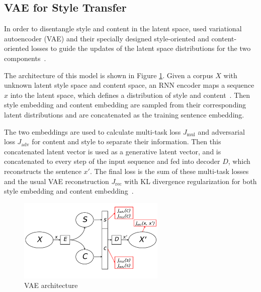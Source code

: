 \documentclass[11pt,a4paper]{article}
\newcommand{\figref}[1]{Figure \ref{#1}}
\begin{document}
\subsection{VAE for Style Transfer}
In order to disentangle style and content in the latent space, \citet{john2018disentangled} used variational autoencoder (VAE) and their specially designed style-oriented and content-oriented losses to guide the updates of the latent space distributions for the two components~\citep{kingma2013auto}. 

The architecture of this model is shown in \figref{fig:vae}. Given a corpus $X$ with unknown latent style space and content space, 
an RNN encoder maps a sequence $x$ into the latent space, 
which defines a distribution of style and content~\citep{cho2014learning}. 
Then style embedding and content embedding are sampled from 
their corresponding latent distributions and are concatenated 
as the training sentence embedding. 

The two embeddings are used to calculate multi-task 
loss $J_{\mathrm{mul}}$ and adversarial loss $J_{\mathrm{adv}}$ 
for content and style to separate their information. 
Then this concatenated latent vector is used as a generative 
latent vector, and is concatenated to every step of the input sequence
and fed into decoder $D$, which reconstructs the sentence $x'$. 
The final loss is the sum of these multi-task losses and the usual VAE reconstruction $J_{\mathrm{rec}}$ with 
KL divergence regularization for both style embedding and content 
embedding~\citep{kingma2013auto}.

\begin{figure}[htbp]
	\centering
	\includegraphics[width=7cm]{./images/vae.pdf}
	\caption{VAE architecture}
	\label{fig:vae}
\end{figure}
\end{document}
